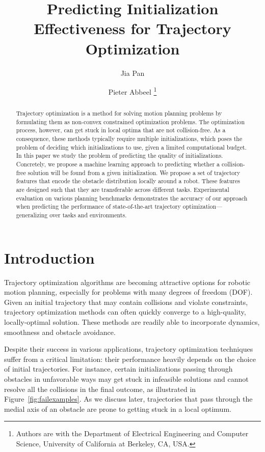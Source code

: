 \documentclass[letterpaper, 10 pt, conference]{ieeeconf}  %
\title{\LARGE \bf
  Predicting Initialization Effectiveness for Trajectory Optimization
}
\author{Jia Pan \and Pieter Abbeel \thanks{Authors are with the Department of Electrical Engineering and Computer Science, University of California at Berkeley, CA, USA.}}
\begin{document}
\maketitle
\thispagestyle{empty}
\pagestyle{empty}


\begin{abstract}
Trajectory optimization is a method for solving motion planning problems by formulating them as non-convex constrained optimization problems. The optimization process, however, can get stuck in local optima that are not collision-free. As a consequence, these methods typically require  multiple initializations, which poses the problem of deciding which initializations to use, given a limited computational budget. In this paper we study the problem of predicting the quality of initializations.  Concretely, we propose a machine learning approach to predicting whether a collision-free solution will be found from a given initialization. We propose a set of trajectory features that encode the obstacle distribution locally around a robot. These features are designed such that they are transferable across different tasks. Experimental evaluation on various planning benchmarks demonstrates the accuracy of our approach when predicting the performance of state-of-the-art trajectory optimization---generalizing over tasks and environments.
\end{abstract}


\section{Introduction}
Trajectory optimization algorithms are becoming attractive options for robotic motion planning, especially for problems with many degrees of freedom (DOF). Given an initial trajectory that may contain collisions and violate constraints, trajectory optimization methods can often quickly converge to a high-quality, locally-optimal solution. These methods are readily able to incorporate dynamics, smoothness and obstacle avoidance.

Despite their success in various applications, trajectory optimization techniques suffer from a critical limitation: their performance heavily depends on the choice of initial trajectories. For instance, certain initializations passing through obstacles in unfavorable ways may get stuck in infeasible solutions and cannot resolve all the collisions in the final outcome, as illustrated in Figure~\ref{fig:failexamples}. As we discuss later, trajectories that pass through the medial axis of an obstacle are prone to getting stuck in a local optimum.
\end{document}
